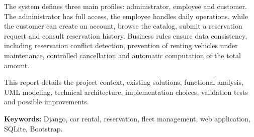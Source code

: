 The system defines three main profiles: administrator, employee and customer. The administrator has full access, the employee handles daily operations, while the customer can create an account, browse the catalog, submit a reservation request and consult reservation history. Business rules ensure data consistency, including reservation conflict detection, prevention of renting vehicles under maintenance, controlled cancellation and automatic computation of the total amount.

This report details the project context, existing solutions, functional analysis, UML modeling, technical architecture, implementation choices, validation tests and possible improvements.

\textbf{Keywords:} Django, car rental, reservation, fleet management, web application, SQLite, Bootstrap.
\clearpage
